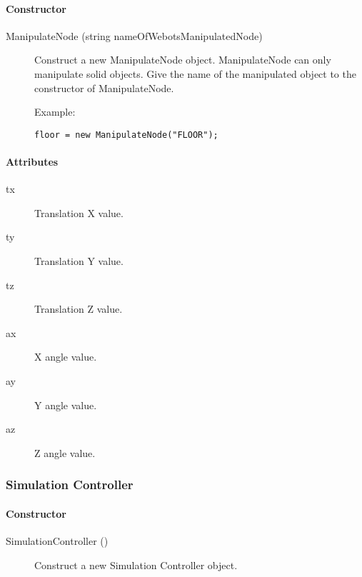 \paragraph{Constructor}
\label{webots.uobjects.supervisor.manipulatenode.constructor}%

\noindent
\begin{description}
\item[{ManipulateNode (string nameOfWebotsManipulatedNode)}] Construct a new ManipulateNode object. ManipulateNode can only
          manipulate solid objects. Give the name of the manipulated object to
          the constructor of ManipulateNode.

Example:

\begin{lstlisting}[firstnumber=1,]
floor = new ManipulateNode("FLOOR");
\end{lstlisting}
\end{description}

\paragraph{Attributes}
\label{webots.uobjects.supervisor.manipulatenode.attributes}%

\noindent
\begin{description}
\item[{tx}] Translation X value.
\item[{ty}] Translation Y value.
\item[{tz}] Translation Z value.
\item[{ax}] X angle value.
\item[{ay}] Y angle value.
\item[{az}] Z angle value.
\end{description}

\subsubsection{Simulation Controller}
\label{webots.uobjects.supervisor.simulationcontroller}%

\paragraph{Constructor}
\label{webots.uobjects.supervisor.simulationcontroller.constructor}%

\noindent
\begin{description}
\item[{SimulationController ()}] Construct a new Simulation Controller object.

\end{description}

